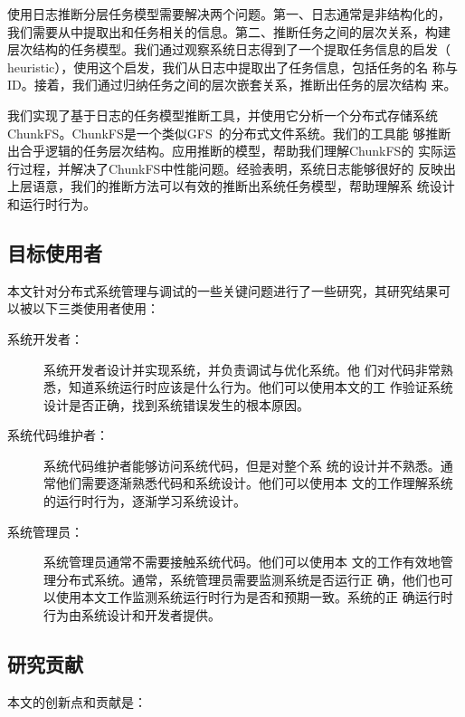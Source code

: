 使用日志推断分层任务模型需要解决两个问题。第一、日志通常是非结构化的，
我们需要从中提取出和任务相关的信息。第二、推断任务之间的层次关系，构建
层次结构的任务模型。我们通过观察系统日志得到了一个提取任务信息的启发（
heuristic），使用这个启发，我们从日志中提取出了任务信息，包括任务的名
称与ID。接着，我们通过归纳任务之间的层次嵌套关系，推断出任务的层次结构
来。

我们实现了基于日志的任务模型推断工具，并使用它分析一个分布式存储系统
ChunkFS。ChunkFS是一个类似GFS~\cite{gfs}的分布式文件系统。我们的工具能
够推断出合乎逻辑的任务层次结构。应用推断的模型，帮助我们理解ChunkFS的
实际运行过程，并解决了ChunkFS中性能问题。经验表明，系统日志能够很好的
反映出上层语意，我们的推断方法可以有效的推断出系统任务模型，帮助理解系
统设计和运行时行为。

\subsection{目标使用者}

本文针对分布式系统管理与调试的一些关键问题进行了一些研究，其研究结果可
以被以下三类使用者使用：

\begin{description}

  \item[系统开发者：] 系统开发者设计并实现系统，并负责调试与优化系统。他
  们对代码非常熟悉，知道系统运行时应该是什么行为。他们可以使用本文的工
  作验证系统设计是否正确，找到系统错误发生的根本原因。

  \item[系统代码维护者：] 系统代码维护者能够访问系统代码，但是对整个系
  统的设计并不熟悉。通常他们需要逐渐熟悉代码和系统设计。他们可以使用本
  文的工作理解系统的运行时行为，逐渐学习系统设计。

  \item[系统管理员：] 系统管理员通常不需要接触系统代码。他们可以使用本
  文的工作有效地管理分布式系统。通常，系统管理员需要监测系统是否运行正
  确，他们也可以使用本文工作监测系统运行时行为是否和预期一致。系统的正
  确运行时行为由系统设计和开发者提供。

\end{description}

\subsection{研究贡献}

本文的创新点和贡献是：

